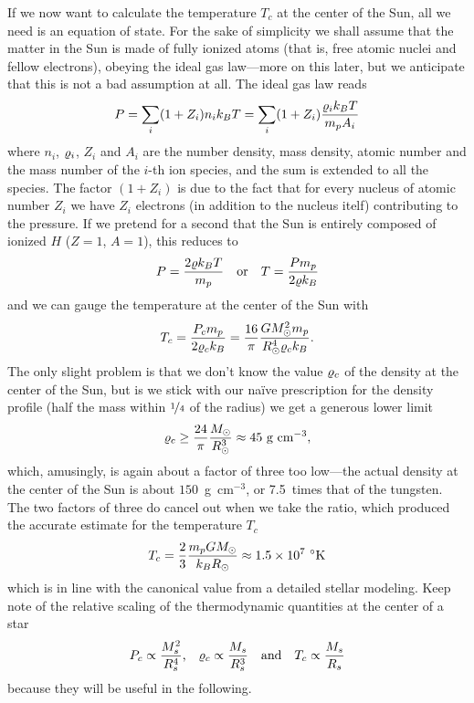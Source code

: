 If we now want to calculate the temperature $T_c$ at the center of the Sun, all we
need is an equation of state. For the sake of simplicity we shall assume that the
matter in the Sun is made of fully ionized atoms (that is, free atomic nuclei and
fellow electrons), obeying the ideal gas law---more on this later, but we anticipate
that this is not a bad assumption at all. The ideal gas law reads
\begin{align}
  P = \sum_i (1 + Z_i)n_i k_B T = \sum_i (1 + Z_i) \frac{\varrho_i k_B T}{m_p A_i}
\end{align}
where $n_i$, $\varrho_i$, $Z_i$ and $A_i$ are the number density, mass density,
atomic number and the mass number of the $i$-th ion species, and the sum is extended
to all the species. The factor $(1 + Z_i)$ is due to the fact that for every nucleus
of atomic number $Z_i$ we have $Z_i$ electrons (in addition to the nucleus itelf)
contributing to the pressure. If we pretend for a second that the Sun is entirely
composed of ionized $H$ ($Z = 1$, $A = 1$), this reduces to
\begin{align*}
	P = \frac{2\varrho k_B T}{m_p} \quad\text{or}\quad
  T = \frac{P m_p}{2\varrho k_B}
\end{align*}
and we can gauge the temperature at the center of the Sun with
\begin{align*}
  T_c = \frac{P_c m_p}{2 \varrho_c k_B} =
	\frac{16}{\pi} \frac{G M_\odot^2 m_p}{R_\odot^4 \varrho_c k_B}.
\end{align*}
The only slight problem is that we don't know the value $\varrho_c$ of the density
at the center of the Sun, but is we stick with our na\"ive prescription for the density
profile (half the mass within $\nicefrac{1}{4}$ of the radius) we get a generous
lower limit
\begin{align*}
	\varrho_c \geq \frac{24}{\pi} \frac{M_\odot}{R_\odot^3} \approx 45~\text{g~cm}^{-3},
\end{align*}
which, amusingly, is again about a factor of three too low---the actual density at
the center of the Sun is about $150$~g~cm$^{-3}$, or 7.5~times that of the tungsten.
The two factors of three do cancel out when we take the ratio, which produced the
accurate estimate for the temperature $T_c$
\begin{align*}
	T_c = \frac{2}{3} \frac{m_p G M_\odot}{k_B R_\odot} \approx 1.5 \times 10^7~^\circ\text{K}
\end{align*}
which is in line with the canonical value from a detailed stellar modeling.
Keep note of the relative scaling of the thermodynamic quantities at the center
of a star
\begin{align}
	P_c \propto \frac{M_s^2}{R_s^4} \text{,}\quad
	\varrho_c \propto \frac{M_s}{R_s^3} \quad\text{and}\quad
	T_c \propto \frac{M_s}{R_s}
\end{align}
because they will be useful in the following.

